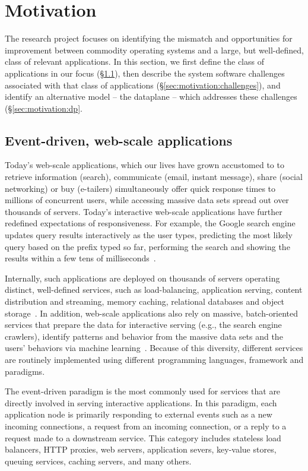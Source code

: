 
\section{Motivation}
\label{sec:motivation}

The research project focuses on identifying the mismatch and
opportunities for improvement between commodity operating systems and
a large, but well-defined, class of relevant applications.  In this
section, we first define the class of applications in our focus
(\S\ref{sec:motivation:web}), then describe the system software
challenges associated with that class of applications
(\S\ref{sec:motivation:challenges}), and identify an alternative model --
the dataplane -- which addresses these challenges
(\S\ref{sec:motivation:dp}.

\subsection{Event-driven, web-scale applications}
\label{sec:motivation:web}

Today's web-scale applications, which our lives have grown accustomed
to to retrieve information (search), communicate (email, instant
message), share (social networking) or buy (e-tailers) simultaneously
offer quick response times to millions of concurrent users, while
accessing massive data sets spread out over thousands of servers.
Today's interactive web-scale applications have further redefined
expectations of responsiveness. For example, the Google search engine
updates query results interactively as the user types, predicting the
most likely query based on the prefix typed so far, performing the
search and showing the results within a few tens of
milliseconds~\cite{DBLP:journals/cacm/DeanB13}.

Internally, such applications are deployed on thousands of servers
operating distinct, well-defined services, such as load-balancing,
application serving, content distribution and streaming, memory
caching, relational databases and object storage~\cite{missing}.  In
addition, web-scale applications also rely on massive, batch-oriented
services that prepare the data for interactive serving (e.g., the
search engine crawlers), identify patterns and behavior from the
massive data sets and the users' behaviors via machine
learning~\cite{missing}.  Because of this diversity, different
services are routinely implemented using different programming
languages, framework and paradigms.

The event-driven paradigm is the most commonly used for services that
are directly involved in serving interactive applications.  In this
paradigm, each application node is primarily responding to external
events such as a new incoming connections, a request from an incoming
connection, or a reply to a request made to a downstream service.
This category includes stateless load balancers, HTTP proxies, web
servers, application severs, key-value stores, queuing services,
caching servers, and many others.  

